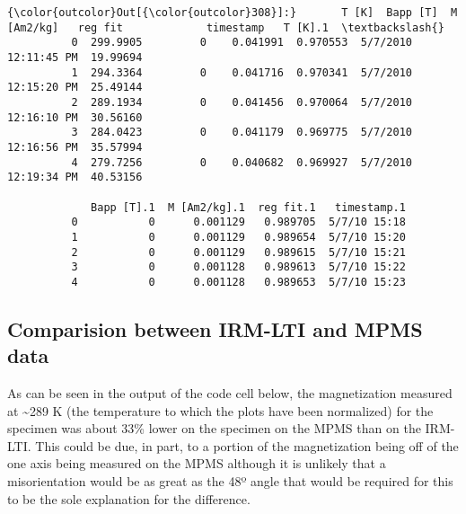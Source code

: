 \documentclass{article}
\begin{document}
            \begin{Verbatim}[commandchars=\\\{\}]
{\color{outcolor}Out[{\color{outcolor}308}]:}       T [K]  Bapp [T]  M [Am2/kg]   reg fit             timestamp   T [K].1  \textbackslash{}
          0  299.9905         0    0.041991  0.970553  5/7/2010 12:11:45 PM  19.99694   
          1  294.3364         0    0.041716  0.970341  5/7/2010 12:15:20 PM  25.49144   
          2  289.1934         0    0.041456  0.970064  5/7/2010 12:16:10 PM  30.56160   
          3  284.0423         0    0.041179  0.969775  5/7/2010 12:16:56 PM  35.57994   
          4  279.7256         0    0.040682  0.969927  5/7/2010 12:19:34 PM  40.53156   
          
             Bapp [T].1  M [Am2/kg].1  reg fit.1   timestamp.1  
          0           0      0.001129   0.989705  5/7/10 15:18  
          1           0      0.001129   0.989654  5/7/10 15:20  
          2           0      0.001129   0.989615  5/7/10 15:21  
          3           0      0.001128   0.989613  5/7/10 15:22  
          4           0      0.001128   0.989653  5/7/10 15:23  
\end{Verbatim}
        

    \subsection{Comparision between IRM-LTI and MPMS data}


    As can be seen in the output of the code cell below, the magnetization
measured at \textasciitilde{}289 K (the temperature to which the plots
have been normalized) for the specimen was about 33\% lower on the
specimen on the MPMS than on the IRM-LTI. This could be due, in part, to
a portion of the magnetization being off of the one axis being measured
on the MPMS although it is unlikely that a misorientation would be as
great as the 48º angle that would be required for this to be the sole
explanation for the difference.
\end{document}
